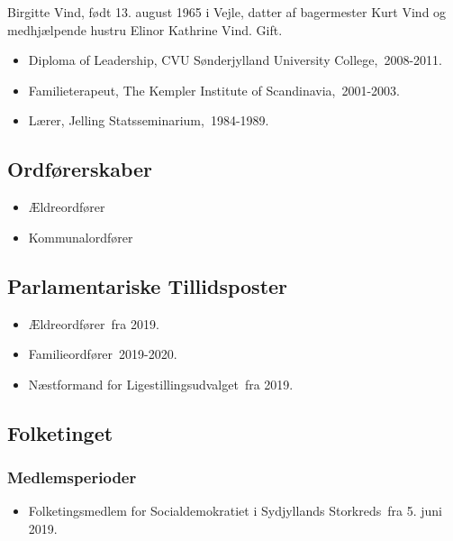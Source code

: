 \documentclass[11pt, a4paper]{awesome-cv}
\begin{document}
\makecvheader[R]
\makelettertitle
\begin{cvletter}
Birgitte Vind, født 13. august 1965 i Vejle, datter af bagermester Kurt Vind og medhjælpende hustru Elinor Kathrine Vind. Gift.

\begin{itemize}
\item Diploma of Leadership, CVU Sønderjylland University College, 2008-2011.
\item Familieterapeut, The Kempler Institute of Scandinavia, 2001-2003.
\item Lærer, Jelling Statsseminarium, 1984-1989.
\end{itemize}
\subsection*{Ordførerskaber}
\begin{itemize}
\item Ældreordfører
\item Kommunalordfører
\end{itemize}
\subsection*{Parlamentariske Tillidsposter}
\begin{itemize}
\item Ældreordfører fra 2019.
\item Familieordfører 2019-2020.
\item Næstformand for Ligestillingsudvalget fra 2019.
\end{itemize}
\subsection*{Folketinget}
\subsubsection*{Medlemsperioder}
\begin{itemize}
\item Folketingsmedlem for Socialdemokratiet i Sydjyllands Storkreds fra 5. juni 2019.
\end{itemize}

\end{cvletter}
\end{document}
